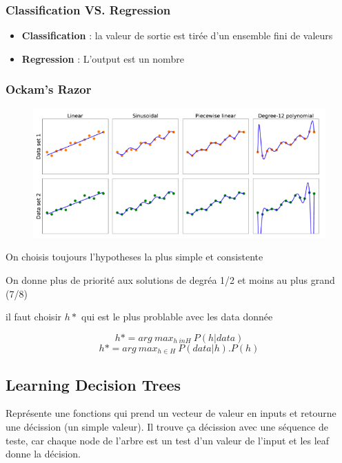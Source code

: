 \documentclass[12pt]{article}
\begin{document}
		\subsubsection{Classification VS. Regression}
			\begin{itemize}
				\item \textbf{Classification} : la valeur de sortie est tirée d'un ensemble fini de valeurs
				\item \textbf{Regression} : L'output est un nombre
			
			\end{itemize}
			
		\subsubsection{Ockam's Razor}
			\begin{figure}[H]
				\centering
				\includegraphics[width=\textwidth]{img/razor.png}
			\end{figure}
			
			On choisis toujours l'hypotheses la plus simple et consistente
			
			On donne plus de priorité aux solutions de degréa 1/2 et moins au plus grand (7/8)
			
			il faut choisir $h*$ qui est le plus problable avec les data donnée
			
			\begin{equation}
				h* = arg \ max_{h\ in H} \ P(h|data)
			\end{equation}
			\begin{equation}
				h* = arg \ max_{h \in H} \ P(data|h).P(h)
			\end{equation}
			
	\subsection{Learning Decision Trees}
		Représente une fonctions qui prend un vecteur de valeur en inputs et retourne une décission (un simple valeur). Il trouve ça décission avec une séquence de teste, car chaque node de l'arbre est un test d'un valeur de l'input et les leaf donne la décision.
		
\end{document}
